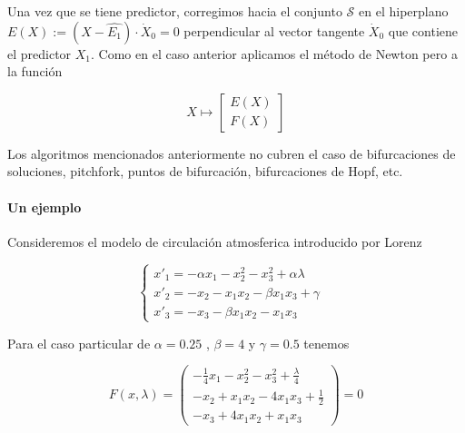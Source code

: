 \documentclass[11pt]{article}
\begin{document}
Una vez que se tiene predictor, corregimos hacia el conjunto
\(\mathcal{S}\) en el hiperplano
\(E(X) := (X - \hat{E_1})\cdot \dot{X}_0 = 0\) perpendicular al vector
tangente \(\dot{X}_0\) que contiene el predictor \(X_1\). Como en el
caso anterior aplicamos el método de Newton pero a la función

\begin{equation}
X \mapsto \begin{bmatrix}
           E(X) \\
           F(X)
         \end{bmatrix}  
\end{equation}

Los algoritmos mencionados anteriormente no cubren el caso de
bifurcaciones de soluciones, pitchfork, puntos de bifurcación,
bifurcaciones de Hopf, etc.

    \hypertarget{un-ejemplo}{%
\paragraph{Un ejemplo}\label{un-ejemplo}}

Consideremos el modelo de circulación atmosferica introducido por Lorenz

\[  \left\{
\begin{array}{ll}
      x'_1 = - \alpha x_1 -x_2^2 - x_3^2 + \alpha\lambda & \\
      x'_2 = - x_2 - x_1x_2 - \beta x_1x_3 + \gamma & \\
      x'_3 = - x_3 - \beta x_1x_2 - x_1x_3 &
\end{array} 
\right.\]

Para el caso particular de \(\alpha = 0.25\) , \(\beta = 4\) y
\(\gamma = 0.5\) tenemos

\[ F(x, \lambda) =  \left(
\begin{array}{l}
      - \frac{1}{4} x_1 -x_2^2 - x_3^2 + \frac{\lambda}{4} \\
      - x_2 + x_1x_2 - 4 x_1x_3 + \frac{1}{2} \\
      - x_3 + 4 x_1x_2 + x_1x_3 
\end{array} 
\right) = 0\]
\end{document}
